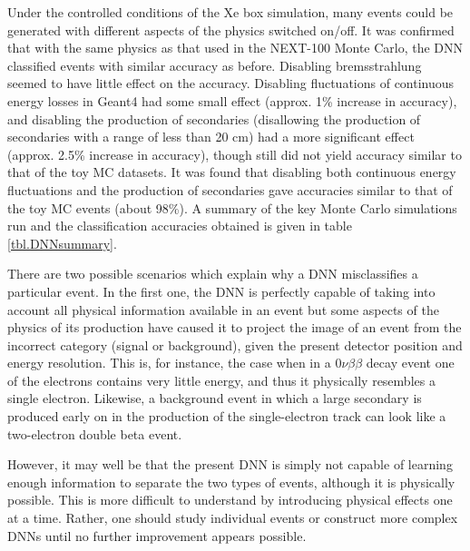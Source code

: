 \documentclass[a4paper,11pt]{article}
\begin{document}
Under the controlled conditions of the Xe box simulation, many events could be generated with different aspects of the physics switched on/off.  It was confirmed that with the same physics as 
that used in the NEXT-100 Monte Carlo, the DNN classified events 
with similar accuracy as before.  Disabling bremsstrahlung seemed to have little effect on the accuracy.  Disabling fluctuations of continuous energy losses in Geant4 had some small 
effect (approx. 1\% increase in accuracy), and disabling the production of secondaries (disallowing the production of secondaries with a range of less than 20 cm) had a more 
significant effect (approx. 2.5\% increase in accuracy), though still did not yield accuracy similar to that of the toy MC datasets.  It was found that disabling both continuous energy fluctuations 
and the production of secondaries gave accuracies similar to that of the toy MC events (about 98\%).  A summary of the key Monte Carlo simulations run and the classification accuracies 
obtained is given in table \ref{tbl.DNNsummary}.

There are two possible scenarios which explain why a DNN misclassifies a particular event. In the first one, the DNN is perfectly capable of taking into account all physical information available in an event but some aspects of the physics of its production have caused it to project the image of an event from the incorrect category (signal or background), given the present detector position and energy resolution. This is, for instance, the case when in a $0\nu\beta\beta$ decay event one of the electrons contains very little energy, and thus it physically resembles a single electron. Likewise, a background event in which a large secondary is produced early on in the production of the single-electron track can look like a two-electron double beta event.

However, it may well be that the present DNN is simply not capable of learning enough information to separate the two types of events, although it is physically possible. This is more difficult to understand by introducing physical effects one at a time. Rather, one should study individual events or construct more complex DNNs until no further improvement appears possible.
\end{document}
